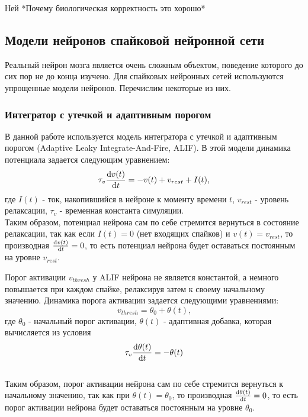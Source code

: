\documentclass[a4paper]{article}
\begin{document}
Ней
*Почему биологическая корректность это хорошо*

\subsection{Модели нейронов спайковой нейронной сети}
Реальный нейрон мозга является очень сложным объектом, поведение которого до сих пор не до конца изучено. Для спайковых нейронных сетей используются упрощенные модели нейронов. Перечислим некоторые из них.

\subsubsection{Интегратор с утечкой и адаптивным порогом}
В данной работе используется модель интегратора с утечкой и адаптивным порогом (Adaptive Leaky Integrate-And-Fire, ALIF). В этой модели динамика потенциала задается следующим уравнением:
\begin{equation} \label{ALIF_voltage_dynamics}
 \tau_v \dv{v(t)}{t} = -v(t) + v_{rest} + I(t) \text{,}
\end{equation} где $I(t)$ - ток, накопившийся в нейроне к моменту времени $t$, $v_{rest}$ - уровень релаксации, $\tau_v$ - временная константа симуляции.\\
Таким образом, потенциал нейрона сам по себе стремится вернуться в состояние релаксации, так как если $I(t) = 0$ (нет входящих спайков) и $v(t) = v_{rest}$, то производная $\dv{v(t)}{t} = 0$, то есть потенциал нейрона будет оставаться постоянным на уровне $v_{rest}$.


Порог активации $v_{thresh}$ у ALIF нейрона не является константой, а немного повышается при каждом спайке, релаксируя затем к своему начальному значению. Динамика порога активации задается следующими уравнениями:
\begin{equation} \label{ALIF_thresh}
 v_{thresh} = \theta_0 + \theta(t) \text{,}
\end{equation} где $\theta_0$ - начальный порог активации, $\theta(t)$ - адаптивная добавка, которая вычисляется из условия\\

\begin{equation} \label{ALIF_thresh_dynamics}
 \tau_v \dv{\theta(t)}{t} = -\theta(t)
\end{equation}\\
Таким образом, порог активации нейрона сам по себе стремится вернуться к начальному значению, так как при $\theta(t) = \theta_0$, то производная $\dv{\theta(t)}{t} = 0$, то есть порог активации нейрона будет оставаться постоянным на уровне $\theta_0$.\\
\end{document}

